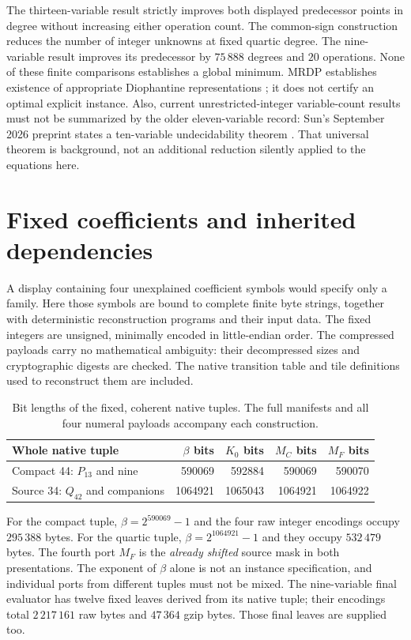 \documentclass[11pt,a4paper]{article}
\numberwithin{equation}{section}
\begin{document}
The thirteen-variable result strictly improves both displayed predecessor
points in degree without increasing either operation count. The
common-sign construction reduces the number of integer unknowns at fixed
quartic degree. The nine-variable result improves its predecessor by
$75\,888$ degrees and $20$ operations. None of these finite comparisons
establishes a global minimum. MRDP establishes existence of appropriate
Diophantine representations \cite{matiyasevich,jones}; it does not certify
an optimal explicit instance. Also, current unrestricted-integer
variable-count results must not be summarized by the older eleven-variable
record: Sun's September 2026 preprint states a ten-variable undecidability
theorem \cite{sun2026}. That universal theorem is background, not an
additional reduction silently applied to the equations here.

\section{Fixed coefficients and inherited dependencies}
\label{sec:binding}

A display containing four unexplained coefficient symbols would specify
only a family. Here those symbols are bound to complete finite byte
strings, together with deterministic reconstruction programs and their
input data. The fixed integers are unsigned, minimally encoded in
little-endian order. The compressed payloads carry no mathematical
ambiguity: their decompressed sizes and cryptographic digests are checked.
The native transition table and tile definitions used to reconstruct them
are included.

\begin{table}[htbp]
\centering\small
\begin{tabular}{@{}lrrrr@{}}
\toprule
Whole native tuple & $\beta$ bits & $K_0$ bits & $M_C$ bits & $M_F$ bits\\
\midrule
Compact 44: $P_{13}$ and nine & 590069 & 592884 & 590069 & 590070\\
Source 34: $Q_{42}$ and companions & 1064921 & 1065043 & 1064921 & 1064922\\
\bottomrule
\end{tabular}
\caption{Bit lengths of the fixed, coherent native tuples. The full
manifests and all four numeral payloads accompany each construction.}
\label{tab:ports}
\end{table}

For the compact tuple, $\beta=2^{590069}-1$ and the four raw integer
encodings occupy $295\,388$ bytes. For the quartic tuple,
$\beta=2^{1064921}-1$ and they occupy $532\,479$ bytes. The fourth port
$M_F$ is the \emph{already shifted} source mask in both presentations.
The exponent of $\beta$ alone is not an instance specification, and
individual ports from different tuples must not be mixed. The
nine-variable final evaluator has twelve fixed leaves derived from its
native tuple; their encodings total $2\,217\,161$ raw bytes and $47\,364$
gzip bytes. Those final leaves are supplied too.
\end{document}
